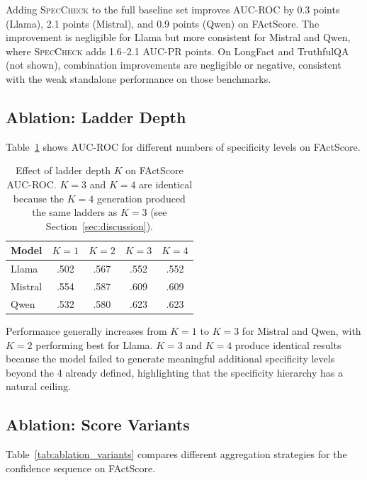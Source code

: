 \documentclass{article}
\newcommand{\speccheck}{\textsc{SpecCheck}}
\begin{document}
Adding \speccheck{} to the full baseline set improves AUC-ROC by 0.3 points (Llama), 2.1 points (Mistral), and 0.9 points (Qwen) on FActScore.
The improvement is negligible for Llama but more consistent for Mistral and Qwen, where \speccheck{} adds 1.6--2.1 AUC-PR points.
On LongFact and TruthfulQA (not shown), combination improvements are negligible or negative, consistent with the weak standalone performance on those benchmarks.

\subsection{Ablation: Ladder Depth}

Table~\ref{tab:ablation_depth} shows AUC-ROC for different numbers of specificity levels on FActScore.

\begin{table}[t]
\centering
\caption{Effect of ladder depth $K$ on FActScore AUC-ROC. $K{=}3$ and $K{=}4$ are identical because the $K{=}4$ generation produced the same ladders as $K{=}3$ (see Section~\ref{sec:discussion}).}
\label{tab:ablation_depth}
\begin{tabular}{lcccc}
\toprule
Model & $K{=}1$ & $K{=}2$ & $K{=}3$ & $K{=}4$ \\
\midrule
Llama   & .502 & .567 & .552 & .552 \\
Mistral & .554 & .587 & .609 & .609 \\
Qwen    & .532 & .580 & .623 & .623 \\
\bottomrule
\end{tabular}
\end{table}

Performance generally increases from $K{=}1$ to $K{=}3$ for Mistral and Qwen, with $K{=}2$ performing best for Llama.
$K{=}3$ and $K{=}4$ produce identical results because the model failed to generate meaningful additional specificity levels beyond the 4 already defined, highlighting that the specificity hierarchy has a natural ceiling.

\subsection{Ablation: Score Variants}

Table~\ref{tab:ablation_variants} compares different aggregation strategies for the confidence sequence on FActScore.
\end{document}
